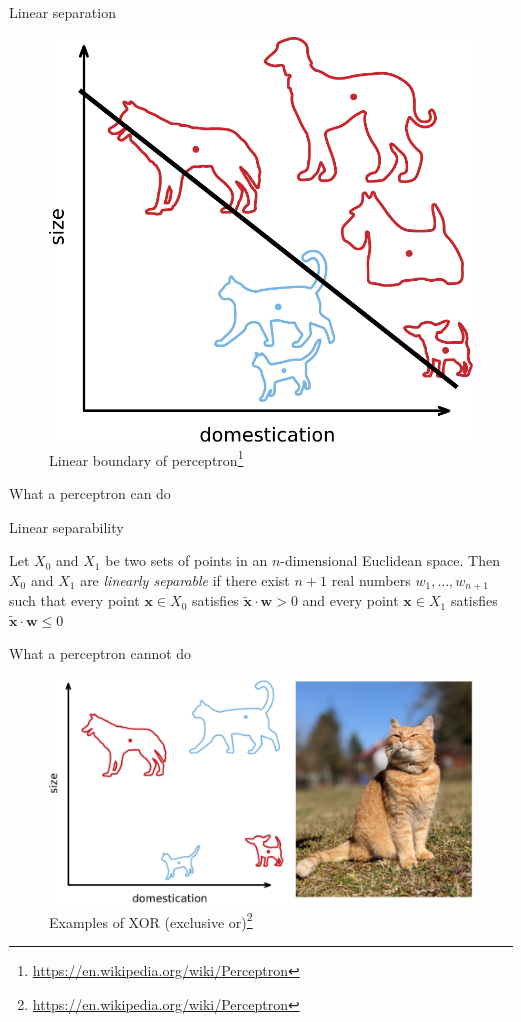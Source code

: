 \documentclass[12pt]{beamer}
\begin{document}
\begin{frame}{Linear separation}


\begin{figure}
\includegraphics[width=0.5\linewidth]{img/Perceptron_example_wikipedia.pdf}	
\caption{Linear boundary of perceptron\footnote{\tiny \url{https://en.wikipedia.org/wiki/Perceptron}}}
	
\end{figure}	

\end{frame}

\begin{frame}{What a perceptron can do}
	
Linear separability

Let $X_0$ and $X_1$ be two sets of points in an $n$-dimensional Euclidean space.
Then $X_0$ and $X_1$ are \emph{linearly separable} if there exist $n + 1$ real numbers $w_1, \dots, w_{n + 1}$ such that every point $\mathbf{x} \in X_0$ satisfies $\tilde{\mathbf{x}} \cdot \mathbf{w} > 0$ and every point $\mathbf{x} \in X_1$ satisfies $\tilde{\mathbf{x}} \cdot \mathbf{w} \leq 0$
	
\end{frame}

\begin{frame}{What a perceptron cannot do}
	
\begin{figure}
\includegraphics[width=0.7\linewidth]{img/Perceptron_example_wikipedia_xor.pdf}
\caption{Examples of XOR (exclusive or)\footnote{\tiny \url{https://en.wikipedia.org/wiki/Perceptron}}}
\end{figure}
	
\end{frame}
\end{document}
